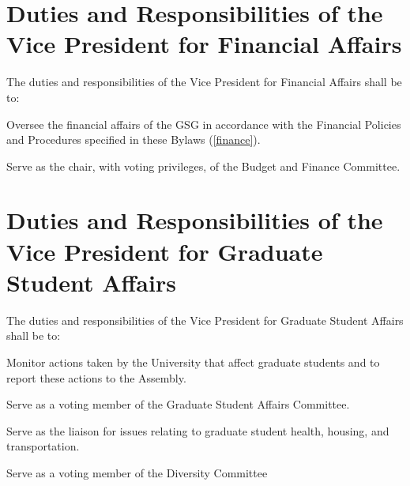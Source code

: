 \section{Duties and Responsibilities of the Vice President for Financial Affairs}
The duties and responsibilities of the Vice President for Financial Affairs shall be to:
\begin{bylaws-number}
  \item Oversee the financial affairs of the GSG in accordance with the Financial Policies and Procedures specified in these Bylaws (\chaptername \ref{finance}).
  \item Serve as the chair, with voting privileges, of the Budget and Finance Committee.
\end{bylaws-number}

\section{Duties and Responsibilities of the Vice President for Graduate Student Affairs}
The duties and responsibilities of the Vice President for Graduate Student Affairs shall be to:
\begin{bylaws-number}
  \item Monitor actions taken by the University that affect graduate students and to report these actions to the Assembly.
  \item Serve as a voting member of the Graduate Student Affairs Committee.
  \item Serve as the liaison for issues relating to graduate student health, housing, and transportation.
  \item Serve as a voting member of the Diversity Committee
\end{bylaws-number}

